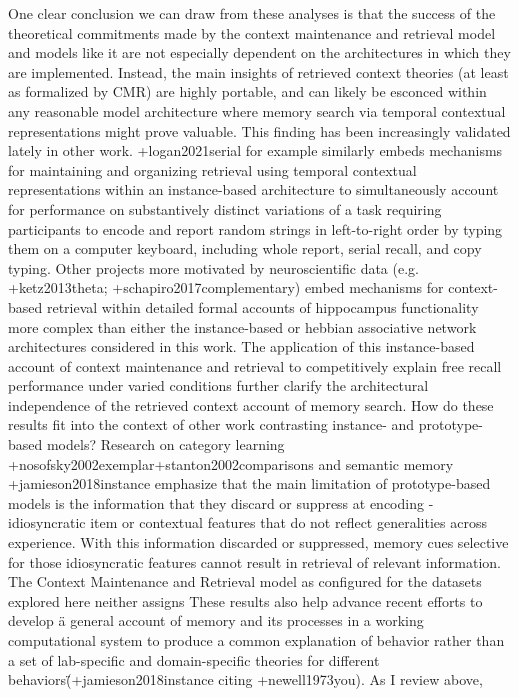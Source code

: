One clear conclusion we can draw from these analyses is that the success of the theoretical commitments made by the context maintenance and retrieval model and models like it are not especially dependent on the architectures in which they are implemented. Instead, the main insights of retrieved context theories (at least as formalized by CMR) are highly portable, and can likely be esconced within any reasonable model architecture where memory search via temporal contextual representations might prove valuable. This finding has been increasingly validated lately in other work. +{}{}{logan2021serial} for example similarly embeds mechanisms for maintaining and organizing retrieval using temporal contextual representations within an instance-based architecture to simultaneously account for performance on substantively distinct variations of a task requiring participants to encode and report random strings in left-to-right order by typing them on a computer keyboard, including whole report, serial recall, and copy typing. Other projects more motivated by neuroscientific data (e.g. +{}{}{ketz2013theta}; +{}{}{schapiro2017complementary}) embed mechanisms for context-based retrieval within detailed formal accounts of hippocampus functionality more complex than either the instance-based or hebbian associative network architectures considered in this work. The application of this instance-based account of context maintenance and retrieval to competitively explain free recall performance under varied conditions further clarify the architectural independence of the retrieved context account of memory search.\markdownRendererInterblockSeparator
{}How do these results fit into the context of other work contrasting instance- and prototype-based models? Research on category learning +{}{}{nosofsky2002exemplar}+{}{}{stanton2002comparisons} and semantic memory +{}{}{jamieson2018instance} emphasize that the main limitation of prototype-based models is the information that they discard or suppress at encoding - idiosyncratic item or contextual features that do not reflect generalities across experience. With this information discarded or suppressed, memory cues selective for those idiosyncratic features cannot result in retrieval of relevant information. The Context Maintenance and Retrieval model as configured for the datasets explored here neither assigns\markdownRendererInterblockSeparator
{}These results also help advance recent efforts to develop \"a general account of memory and its processes in a working computational system to produce a common explanation of behavior rather than a set of lab-specific and domain-specific theories for different behaviors\" (+{}{}{jamieson2018instance} citing +{}{}{newell1973you}). As I review above,\relax